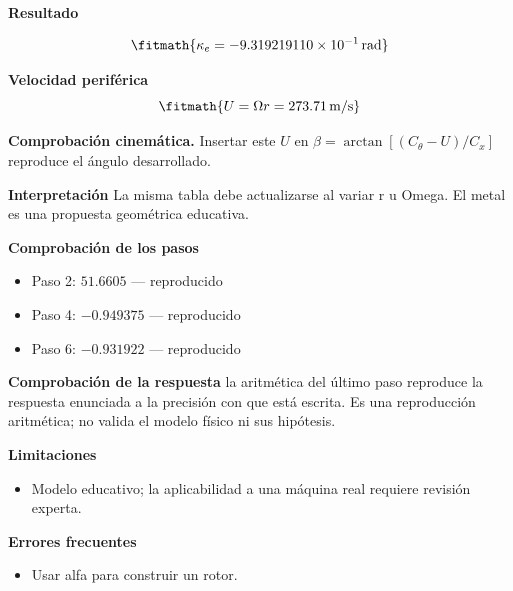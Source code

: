 \documentclass[10pt,openany]{book}
\begin{document}
\begin{tcolorbox}[title={Problema resuelto 1}, studiumworked, breakable]
\noindent\textbf{Resultado}

\[
\fitmath{\kappa_e=-9.319219110\times10^{-1}\,\mathrm{rad}}
\]

\noindent\textbf{Velocidad periférica}
\[
\fitmath{U=\Omega r=273.71\,\mathrm{m/s}}
\]

\noindent\textbf{Comprobación cinemática.} Insertar este $U$ en $\beta=\arctan[(C_\theta-U)/C_x]$ reproduce el ángulo desarrollado.

\noindent\textbf{Interpretación}
La misma tabla debe actualizarse al variar r u Omega. El metal es una propuesta geométrica educativa.

\noindent\textbf{Comprobación de los pasos}
\begin{itemize}
\item Paso 2: $51.6605$ — reproducido
\item Paso 4: $-0.949375$ — reproducido
\item Paso 6: $-0.931922$ — reproducido
\end{itemize}

\noindent\textbf{Comprobación de la respuesta} la aritmética del último paso reproduce la respuesta enunciada a la precisión con que está escrita. Es una reproducción aritmética; no valida el modelo físico ni sus hipótesis.

\noindent\textbf{Limitaciones}
\begin{itemize}
\item Modelo educativo; la aplicabilidad a una máquina real requiere revisión experta.
\end{itemize}

\noindent\textbf{Errores frecuentes}
\begin{itemize}
\item Usar alfa para construir un rotor.
\end{itemize}
\end{tcolorbox}
\end{document}
